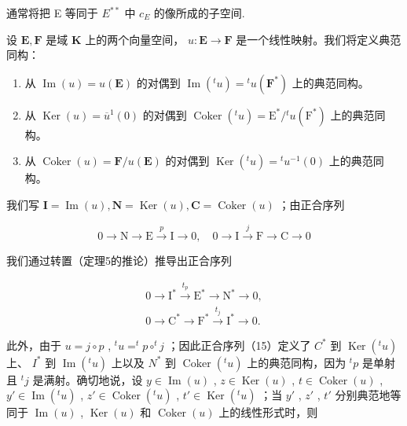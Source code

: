 通常将把 E 等同于 \(E^{**}\) 中 \(c_{E}\) 的像所成的子空间.

设 \(\mathbf{E}, \mathbf{F}\) 是域 \(\mathbf{K}\) 上的两个向量空间， \(u: \mathbf{E} \to \mathbf{F}\) 是一个线性映射。我们将定义典范同构：

\begin{enumerate}
\def\labelenumi{(\arabic{enumi})}
\item
  从 \(\operatorname{Im}(u) = u(\mathbf{E})\) 的对偶到 \(\operatorname{Im}(^t u) = {}^t u(\mathbf{F}^*)\) 上的典范同构。
\item
  从 \(\operatorname{Ker}(u) = \overline{u}^1(0)\) 的对偶到 \(\operatorname{Coker}(^t u) = \mathrm{E}^* / {}^t u(\mathrm{F}^*)\) 上的典范同构。
\item
  从 \(\operatorname{Coker}(u) = \mathbf{F} / u(\mathbf{E})\) 的对偶到 \(\operatorname{Ker}(^t u) = {}^t u^{-1}(0)\) 上的典范同构。
\end{enumerate}

我们写 \(\mathbf{I} = \operatorname{Im}(u),\mathbf{N} = \operatorname{Ker}(u),\mathbf{C} = \operatorname{Coker}(u)\) ；由正合序列

\[
0 \longrightarrow \mathrm{N} \longrightarrow \mathrm{E} \stackrel {p} {\longrightarrow} \mathrm{I} \longrightarrow 0, \quad 0 \longrightarrow \mathrm{I} \stackrel {j} {\longrightarrow} \mathrm{F} \longrightarrow \mathrm{C} \longrightarrow 0 \tag {14}
\]

我们通过转置（定理5的推论）推导出正合序列

\[
\begin{array}{l} 0 \longrightarrow \mathrm{I} ^ {*} \stackrel {{t _ {p}}} {{\longrightarrow}} \mathrm{E} ^ {*} \longrightarrow \mathrm{N} ^ {*} \longrightarrow 0, \\ 0 \longrightarrow \mathrm{C} ^ {*} \longrightarrow \mathrm{F} ^ {*} \stackrel {{t _ {j}}} {{\longrightarrow}} \mathrm{I} ^ {*} \longrightarrow 0. \end{array}\tag{15}
\]

此外，由于 \(u = j \circ p\) , \(^{t}u = ^{t}p \circ ^{t}j\) ；因此正合序列（15）定义了 \(C^*\) 到 \(\operatorname{Ker}(^{t}u)\) 上、 \(I^*\) 到 \(\operatorname{Im}(^{t}u)\) 上以及 \(N^*\) 到 \(\operatorname{Coker}(^{t}u)\) 上的典范同构，因为 \(^{t}p\) 是单射且 \(^{t}j\) 是满射。确切地说，设 \(y \in \operatorname{Im}(u)\) , \(z \in \operatorname{Ker}(u)\) , \(t \in \operatorname{Coker}(u)\) , \(y' \in \operatorname{Im}(^{t}u)\) , \(z' \in \operatorname{Coker}(^{t}u)\) , \(t' \in \operatorname{Ker}(^{t}u)\) ；当 \(y'\) , \(z'\) , \(t'\) 分别典范地等同于 \(\operatorname{Im}(u)\) , \(\operatorname{Ker}(u)\) 和 \(\operatorname{Coker}(u)\) 上的线性形式时，则

